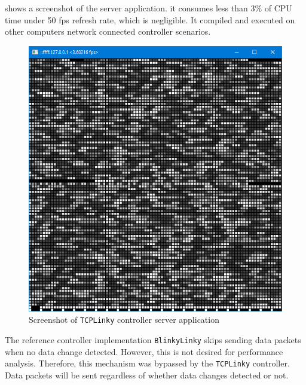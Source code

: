  shows a screenshot of the server application.   it consumes less than $3 \%$ of CPU time under 50 fps refresh rate, which is negligible. It  compiled and executed on other computers  network connected controller scenarios. 

\begin{figure}[t]
  \centering
  \includegraphics[width=0.6\columnwidth]{Figs/tcplinky_server.png}
  \caption{\footnotesize Screenshot of \texttt{TCPLinky} controller server application}
  \label{fig:tcplinky_server}
\end{figure}

The reference controller implementation \texttt{BlinkyLinky} skips sending data packets when no data change  detected. However, this is not desired for performance analysis. Therefore, this mechanism was bypassed by the \texttt{TCPLinky} controller. Data packets will be sent regardless of whether data changes  detected or not.


\section{}

